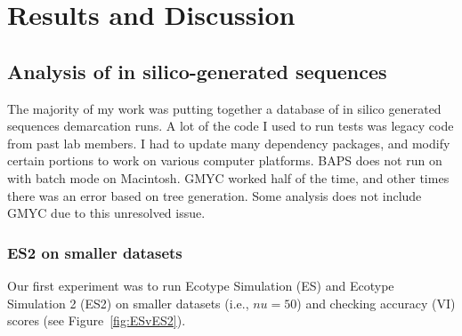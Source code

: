 \section{Results and Discussion}


\subsection*{Analysis of in silico-generated sequences}
The majority of my work was putting together a database of in silico generated sequences demarcation runs.
A lot of the code I used to run tests was legacy code from past lab members.
I had to update many dependency packages, and modify certain portions to work on various computer platforms.
BAPS does not run on with batch mode on Macintosh.
GMYC worked half of the time, and other times there was an error based on tree generation.
Some analysis does not include GMYC due to this unresolved issue.

\subsubsection*{ES2 on smaller datasets}
Our first experiment was to run Ecotype Simulation (ES) and Ecotype Simulation 2 (ES2) on smaller datasets (i.e., $nu = 50$) and checking accuracy (VI) scores (see Figure~\ref{fig:ESvES2}).

